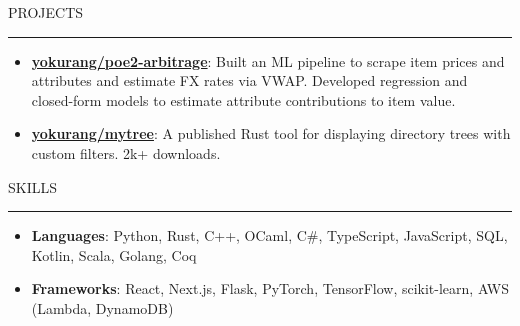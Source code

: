 \documentclass[letterpaper, 11pt]{article}
\def\sectionlineskip{\medskip}
\def\sectionskip{\medskip}
\def \entryspacing {-0pt}
\newcommand{\SectionHeading}[1]{
  \sectionskip
  \raggedright\raggedbottom\MakeUppercase{\large{#1}}
  \sectionlineskip
  \hrule
  \color{black}
}
\newcommand{\ResumeItem}[2]{
  \item{
    \textbf{#1}{: #2 \vspace{-2.835pt}}
  }
}
\newcommand{\ResumeProjectItem}[3]{
  \item{
    \href{#2}{\textbf{#1}}{: #3 \vspace{-2.835pt}}
  }
}
\newcommand{\ResumeEntryStart}{\begin{itemize}[leftmargin=0mm, label={}]}
\newcommand{\ResumeEntryEnd}{\end{itemize}\vspace{-2.835pt}} %
\newcommand{\ProjectItemListStart}{\begin{itemize}[leftmargin=*, label=$\bullet$]}
\newcommand{\ProjectItemListEnd}{\end{itemize}\vspace{\entryspacing}}
\begin{document}
  \SectionHeading{Projects}
  \ProjectItemListStart
  \ResumeProjectItem{yokurang/poe2-arbitrage}
  {https://github.com/yokurang/path-of-elixe}
  {Built an ML pipeline to scrape item prices and attributes and estimate FX rates via VWAP. Developed regression and closed-form models to estimate attribute contributions to item value.}

  \ResumeProjectItem{yokurang/mytree}
  {https://github.com/yokurang/mytree}
  {A published Rust tool for displaying directory trees with custom filters. 2k+ downloads.}
  \ProjectItemListEnd

  \SectionHeading{Skills}
  \ResumeEntryStart
    \ResumeItem{Languages}{ Python, Rust, C++, OCaml, C\#, TypeScript, JavaScript, SQL, Kotlin, Scala, Golang, Coq }
    \ResumeItem{Frameworks}{ React, Next.js, Flask, PyTorch, TensorFlow, scikit-learn, AWS (Lambda, DynamoDB) }
  \ResumeEntryEnd
\end{document}
